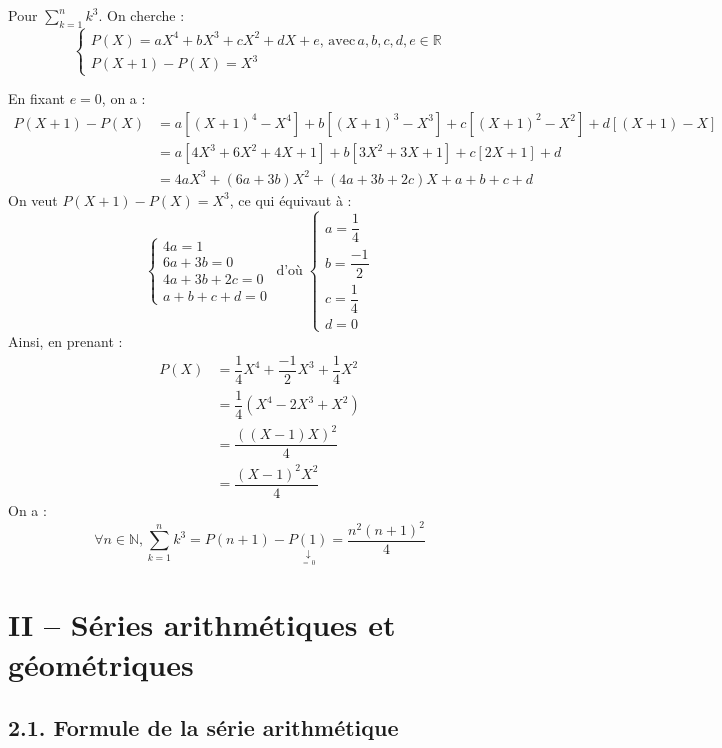 \documentclass[a4paper,11pt]{article}
\newcommand{\N}{\mathbb{N}}
\newcommand{\R}{\mathbb{R}}
\begin{document}
\begin{methode}
	\medskip
	
	Pour $\sum_{k=1}^{n}k^3$. On cherche :
	$$\begin{cases}
		P(X) = aX^4 + bX^3 + cX^2 + dX + e, \, \text{avec} \, a,b,c,d,e \in\R \\
		P(X+1) - P(X) = X^3
	\end{cases} $$
	
	En fixant $e=0$, on a :
	\begin{align*}
		P(X+1) - P(X) &= a[(X+1)^4 - X^4] + b[(X+1)^3 - X^3] + c[(X+1)^2 - X^2] + d[(X+1) - X] \\
		&= a[4X^3 + 6X^2 + 4X + 1] + b[3X^2 + 3X + 1] + c[2X + 1] + d \\
		&= 4aX^3 + (6a + 3b)X^2 + (4a + 3b + 2c)X + a + b + c + d
	\end{align*}
	On veut $P(X+1) - P(X) = X^3$, ce qui équivaut à :
	$$
	\begin{cases}
		4a = 1 \\
		6a + 3b = 0 \\
		4a + 3b + 2c = 0 \\
		a + b + c + d = 0
	\end{cases}
	\; \text{d'où} \;
	\begin{cases}
		a=\dfrac{1}{4}\\
		b=\dfrac{-1}{2}\\
		c=\dfrac{1}{4}\\
		d=0
	\end{cases}	$$
	Ainsi, en prenant :
	\begin{align*}
		P(X) &= \dfrac{1}{4}X^4 + \dfrac{-1}{2}X^3 + \dfrac{1}{4}X^2\\
		&=\dfrac{1}{4}(X^4 - 2X^3 + X^2)\\
		&=\dfrac{((X-1)X)^2}{4}\\
		&=\dfrac{(X-1)^2X^2}{4}
	\end{align*}
	On a :
	$$\forall n\in\N, \sum_{k=1}^{n}k^3 = P(n+1) - \underset{\underset{=\,0}{\downarrow}}{P(1)} = \dfrac{n^2(n+1)^2}{4} $$
	
\end{methode}

\newpage

\section*{II -- Séries arithmétiques et géométriques}

\subsection*{2.1. Formule de la série arithmétique}
\end{document}
